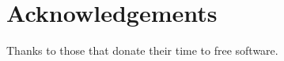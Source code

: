 \chapter*{Acknowledgements}{
\pagestyle{plain} %


Thanks to those that donate their time to free software.



\thispagestyle{plain} %
}
